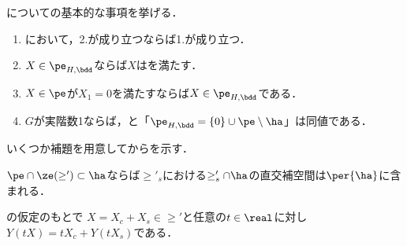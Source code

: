 についての基本的な事項を挙げる．

\begin{lem}\label{lem:basic-prob}
  \leavevmode\vspace{-1em}
  \begin{enumerate}
  \item {}において，2.が成り立つならば1.が成り立つ．
  \item $X\in \pe_{H,\bdd} $ならば$X$はを満たす．
  \item $X \in \pe $が$X_1 = 0$を満たすならば$X\in \pe_{H,\bdd} $である．
  \item $G$が実階数1ならば，と「$\pe_{H,\bdd} =  \{0\}\cup \pe\setminus\ha $」は同値である．
  \end{enumerate}
\end{lem}

いくつか補題を用意してからを示す．
\begin{lem}\label{lem:0117-perp}
  $\pe\cap \ze(\ge')\subset \ha $ならば$\ge'_s $における$\ge_{s}'\cap\ha $の直交補空間は$\per{\ha} $に含まれる．
\end{lem}
\begin{npfwn}
  
\end{npfwn}

\begin{lem}\label{lem:0117-decomp}
  の仮定のもとで $X = X_c + X_s \in \ge' $と任意の$t\in \real$に対し$Y(tX) = tX_c + Y(tX_s) $である．
\end{lem}
\begin{npfwn}
  
\end{npfwn}

